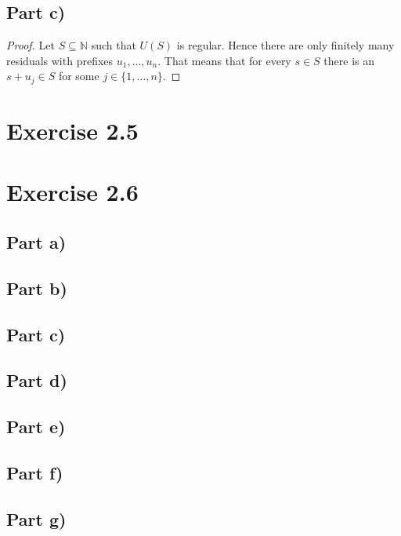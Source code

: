 \documentclass[10pt,a4paper]{article}
\begin{document}
\subsection*{Part c)}

\begin{proof}
  Let $S \subseteq \mathbb{N}$ such that $U(S)$ is regular.
  Hence there are only finitely many residuals with prefixes $u_{1}, \dots, u_{n}$.
  That means that for every $s \in S$ there is an $s + u_{j} \in S$ for some $j \in \{ 1, \dots, n \}$.
\end{proof}

\section*{Exercise 2.5}

\section*{Exercise 2.6}

\subsection*{Part a)}

\subsection*{Part b)}

\subsection*{Part c)}

\subsection*{Part d)}

\subsection*{Part e)}

\subsection*{Part f)}

\subsection*{Part g)}
\end{document}
